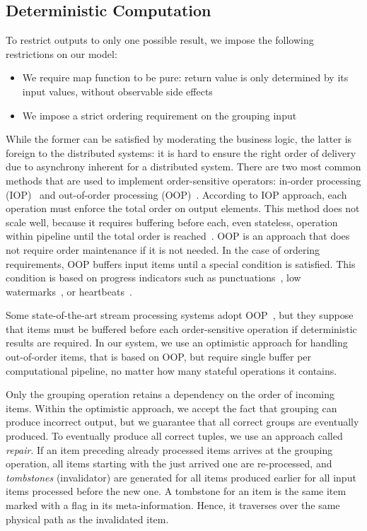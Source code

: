 \subsection {Deterministic Computation}
\label {fs-collision} 

To restrict outputs to only one possible result, we impose the following  restrictions on our model: 

\begin{itemize}
  \item We require map function to be pure: return value is only determined by its input values, without observable side effects
  \item We impose a strict ordering requirement on the grouping  input
\end{itemize}

While the former can be satisfied by moderating the  business logic, the latter is foreign to the distributed systems: it is hard to ensure the right order of delivery due to asynchrony inherent for a distributed system. There are two most common methods that are used to implement order-sensitive operators: in-order processing (IOP)~\cite{Arasu:2006:CCQ:1146461.1146463, Cranor:2003:GSD:872757.872838} and out-of-order processing (OOP)~\cite{Li:2008:OPN:1453856.1453890}. According to IOP approach, each operation must enforce the total order on output elements. This method does not scale well, because it requires buffering before each, even stateless, operation within pipeline until the total order is reached~\cite{Li:2008:OPN:1453856.1453890}. OOP is an approach that does not require order maintenance if it is not needed. In the case of ordering requirements, OOP buffers input items until a special condition is satisfied. This condition is based on progress indicators such as punctuations~\cite{Tucker:2003:EPS:776752.776780}, low watermarks~\cite{Akidau:2013:MFS:2536222.2536229}, or heartbeats~\cite{Srivastava:2004:FTM:1055558.1055596}.  

Some state-of-the-art stream processing systems adopt OOP~\cite{Carbone:2017:SMA:3137765.3137777}, but they suppose that items must be buffered before each order-sensitive operation if deterministic results are required. In our system, we use an optimistic approach for handling out-of-order items, that is based on OOP, but require single buffer per computational pipeline, no matter how many stateful operations it contains.

Only the grouping operation retains a dependency on the order of incoming items. Within the  optimistic approach, we accept the fact that grouping can produce incorrect output, but we guarantee that all correct groups are eventually produced. To eventually produce all correct tuples, we use an approach called {\it repair}. If an item preceding already processed items arrives at the grouping operation, all items starting with the just arrived one are re-processed, and {\em tombstones} (invalidator) are generated for all items produced earlier for all input items processed before the new one. A tombstone for an item is the same item marked with a flag in its meta-information. Hence, it traverses over the same physical path as the invalidated item.


